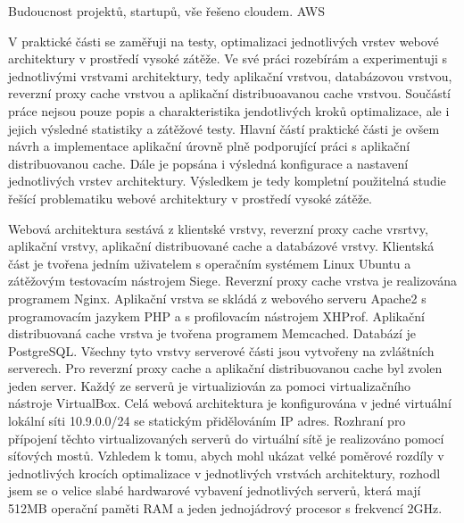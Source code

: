 \documentclass[12pt]{article}
\begin{document}
Budoucnost projektů, startupů, vše řešeno cloudem. AWS




V praktické části se zaměřuji na testy, optimalizaci jednotlivých vrstev webové architektury v prostředí vysoké zátěže. Ve své práci rozebírám a experimentuji s jednotlivými vrstvami architektury, tedy aplikační vrstvou, databázovou vrstvou, reverzní proxy cache vrstvou a aplikační distribuoavanou cache vrstvou. Součástí práce nejsou pouze popis a charakteristika jendotlivých kroků optimalizace, ale i jejich výsledné statistiky a zátěžové testy. Hlavní částí praktické části je ovšem návrh a implementace aplikační úrovně plně podporující práci s aplikační distribuovanou cache. Dále je popsána i výsledná konfigurace a nastavení jednotlivých vrstev architektury. Výsledkem je tedy kompletní použitelná studie řešící problematiku webové architektury v prostředí vysoké zátěže.

Webová architektura sestává z klientské vrstvy, reverzní proxy cache vrsrtvy, aplikační vrstvy, aplikační distribuované cache a databázové vrstvy. Klientská část je tvořena jedním uživatelem s operačním systémem Linux Ubuntu a zátěžovým testovacím nástrojem Siege. Reverzní proxy cache vrstva je realizována programem Nginx. Aplikační vrstva se skládá z webového serveru Apache2 s programovacím jazykem PHP a s profilovacím nástrojem XHProf. Aplikační distribuovaná cache vrstva je tvořena programem Memcached. Databází je PostgreSQL. Všechny tyto vrstvy serverové části jsou vytvořeny na zvláštních serverech. Pro reverzní proxy cache a aplikační distribuovanou cache byl zvolen jeden server. Každý ze serverů je virtualiziován za pomoci virtualizačního nástroje VirtualBox. Celá webová architektura je konfigurována v jedné virtuální lokální síti 10.9.0.0/24 se statickým přidělováním IP adres. Rozhraní pro přípojení těchto virtualizovaných serverů do virtuální sítě je realizováno pomocí síťových mostů. Vzhledem k tomu, abych mohl ukázat velké poměrové rozdíly v jednotlivých krocích optimalizace v jednotlivých vrstvách architektury, rozhodl jsem se o velice slabé hardwarové vybavení jednotlivých serverů, která mají 512MB operační paměti RAM a jeden jednojádrový procesor s frekvencí 2GHz.

\obrazek
{}
\end{document}

